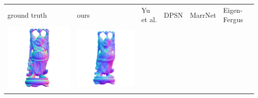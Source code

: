 \begin{center}
\begin{tabularx}{\linewidth}{@{}Y@{}Y@{}Y@{}Y@{}Y@{}Y@{}}
ground truth & ours & Yu et al. & DPSN & MarrNet & Eigen-Fergus \\
\includegraphics[width=\linewidth]{semisynthetic/20160617_20_gt.png} &
\includegraphics[width=\linewidth]{semisynthetic/20160617_20_ours_out.png} &

\end{tabularx}
\end{center}
